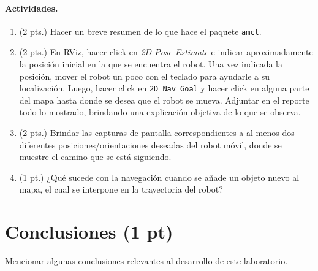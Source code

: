 \documentclass[a4paper,11pt]{robotlabs}
\begin{document}
\paragraph{Actividades.}
\begin{enumerate}
\item (2 pts.) Hacer un breve resumen de lo que hace el paquete \texttt{amcl}.
\item (2 pts.) En RViz, hacer click en \textit{2D Pose Estimate} e indicar
  aproximadamente la posición inicial en la que se encuentra el robot. Una vez
  indicada la posición, mover el robot un poco con el teclado para ayudarle a
  su localización. Luego, hacer click en \texttt{2D Nav Goal} y hacer click en
  alguna parte del mapa hasta donde se desea que el robot se mueva. Adjuntar en
  el reporte todo lo mostrado, brindando una explicación objetiva de lo que se
  observa.

\item (2 pts.) Brindar las capturas de pantalla correspondientes a al menos dos
  diferentes posiciones/orientaciones deseadas del robot móvil, donde se
  muestre el camino que se está siguiendo.

\item (1 pt.) ¿Qué sucede con la navegación cuando se añade un objeto nuevo al
  mapa, el cual se interpone en la trayectoria del robot? 
  
\end{enumerate}




\section{Conclusiones (1 pt)}
Mencionar algunas conclusiones relevantes al desarrollo de este laboratorio.


  
\end{document}

